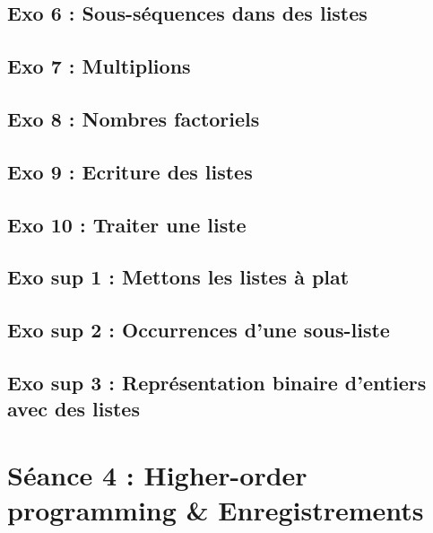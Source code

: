 \subsection{Exo 6 : Sous-séquences dans des listes}


\subsection{Exo 7 : Multiplions}


\subsection{Exo 8 : Nombres factoriels}


\subsection{Exo 9 : Ecriture des listes}


\subsection{Exo 10 : Traiter une liste}



\subsection{Exo sup 1 : Mettons les listes à plat}


\subsection{Exo sup 2 : Occurrences d'une sous-liste}


\subsection{Exo sup 3 : Représentation binaire d'entiers avec des listes}











\newpage
\section{Séance 4 : Higher-order programming \& Enregistrements}

